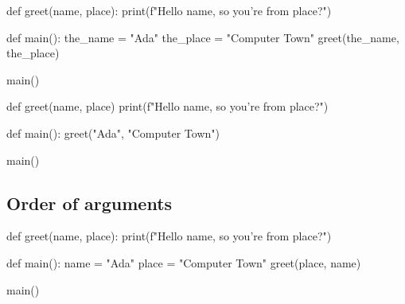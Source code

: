 \begin{pyblock}
def greet(name, place):
    print(f"Hello {name}, so you're from {place}?")

def main():
    the_name = "Ada"
    the_place = "Computer Town"
    greet(the_name, the_place)

main()
\end{pyblock}

\begin{pyblock}
def greet(name, place)
    print(f"Hello {name}, so you're from {place}?")

def main():
    greet("Ada", "Computer Town")

main()
\end{pyblock}

\subsection{Order of arguments}

\begin{pyblock}
def greet(name, place):
    print(f"Hello {name}, so you're from {place}?")

def main():
    name = "Ada"
    place = "Computer Town"
    greet(place, name)

main()
\end{pyblock}



